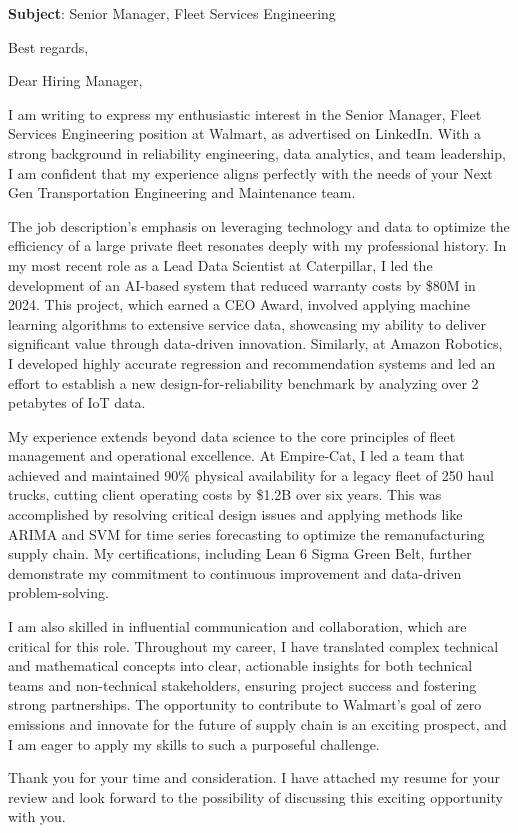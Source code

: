\documentclass[11pt,a4paper,roman]{moderncv}
\newcommand{\jobplatform}{LinkedIn}
\begin{document}
\date{\today}
\opening{\textbf{Subject}: Senior Manager, Fleet Services Engineering}
\closing{Best regards,}
\makelettertitle

\vspace{0.5cm}


Dear Hiring Manager,

I am writing to express my enthusiastic interest in the Senior Manager, Fleet Services Engineering position at Walmart, as advertised on \jobplatform. With a strong background in reliability engineering, data analytics, and team leadership, I am confident that my experience aligns perfectly with the needs of your Next Gen Transportation Engineering and Maintenance team.

The job description's emphasis on leveraging technology and data to optimize the efficiency of a large private fleet resonates deeply with my professional history. In my most recent role as a Lead Data Scientist at Caterpillar, I led the development of an AI-based system that reduced warranty costs by \$80M in 2024. This project, which earned a CEO Award, involved applying machine learning algorithms to extensive service data, showcasing my ability to deliver significant value through data-driven innovation. Similarly, at Amazon Robotics, I developed highly accurate regression and recommendation systems and led an effort to establish a new design-for-reliability benchmark by analyzing over 2 petabytes of IoT data.

My experience extends beyond data science to the core principles of fleet management and operational excellence. At Empire-Cat, I led a team that achieved and maintained 90\% physical availability for a legacy fleet of 250 haul trucks, cutting client operating costs by \$1.2B over six years. This was accomplished by resolving critical design issues and applying methods like ARIMA and SVM for time series forecasting to optimize the remanufacturing supply chain. My certifications, including Lean 6 Sigma Green Belt, further demonstrate my commitment to continuous improvement and data-driven problem-solving.

I am also skilled in influential communication and collaboration, which are critical for this role. Throughout my career, I have translated complex technical and mathematical concepts into clear, actionable insights for both technical teams and non-technical stakeholders, ensuring project success and fostering strong partnerships. The opportunity to contribute to Walmart's goal of zero emissions and innovate for the future of supply chain is an exciting prospect, and I am eager to apply my skills to such a purposeful challenge.

Thank you for your time and consideration. I have attached my resume for your review and look forward to the possibility of discussing this exciting opportunity with you.

 
\makeletterclosing
\end{document}
